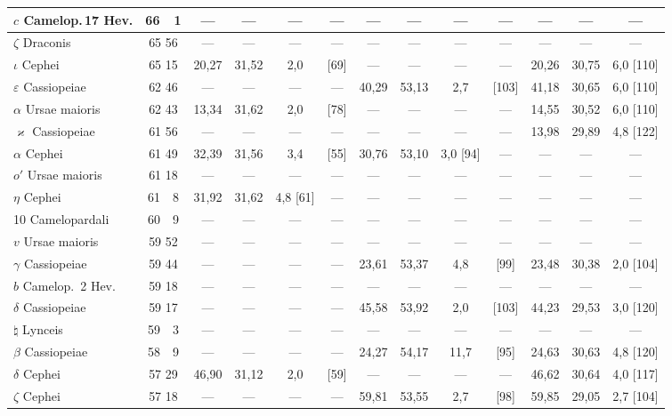 \documentclass[12pt,a4paper]{article}
\theoremstyle{plain}
\theoremstyle{definition}
\theoremstyle{remark}
\begin{document}
{\begin{center}
\begin{tabular}{l|c c c c | c c c c | c c c c}
$c$ Camelop.\,17 Hev. & 66\ \ 1 & --- & --- & --- & --- & --- & --- & --- & --- & --- & --- & --- \\
\midrule
$\zeta$ Draconis & 65 56 & --- & --- & --- & --- & --- & --- & --- & --- & --- & --- & --- \\
$\iota$ Cephei & 65 15 & 20,27 & 31,52 & 2,0 & [69] & --- & --- & --- & --- & 20,26 & 30,75 & 6,0 [110] \\
$\varepsilon$ Cassiopeiae & 62 46 & --- & --- & --- & --- & 40,29 & 53,13 & 2,7 & [103] & 41,18 & 30,65 & 6,0 [110] \\
$\alpha$ Ursae maioris & 62 43 & 13,34 & 31,62 & 2,0 & [78] & --- & --- & --- & --- & 14,55 & 30,52 & 6,0 [110] \\
$\varkappa$ Cassiopeiae & 61 56 & --- & --- & --- & --- & --- & --- & --- & --- & 13,98 & 29,89 & 4,8 [122] \\
\midrule
$\alpha$ Cephei & 61 49 & 32,39 & 31,56 & 3,4 & [55] & 30,76 & 53,10 & 3,0 [94] & --- & --- & --- & --- \\
$o'$ Ursae maioris & 61 18 & --- & --- & --- & --- & --- & --- & --- & --- & --- & --- & --- \\
$\eta$ Cephei & 61\ \ 8 & 31,92 & 31,62 & 4,8 [61] & --- & --- & --- & --- & --- & --- & --- & --- \\
10 Camelopardali & 60\ \ 9 & --- & --- & --- & --- & --- & --- & --- & --- & --- & --- & --- \\
$v$ Ursae maioris & 59 52 & --- & --- & --- & --- & --- & --- & --- & --- & --- & --- & --- \\
\midrule
$\gamma$ Cassiopeiae & 59 44 & --- & --- & --- & --- & 23,61 & 53,37 & 4,8 & [99] & 23,48 & 30,38 & 2,0 [104] \\
$b$ Camelop.\ 2 Hev. & 59 18 & --- & --- & --- & --- & --- & --- & --- & --- & --- & --- & --- \\
$\delta$ Cassiopeiae & 59 17 & --- & --- & --- & --- & 45,58 & 53,92 & 2,0 & [103] & 44,23 & 29,53 & 3,0 [120] \\
$\natural$ Lynceis & 59\ \ 3 & --- & --- & --- & --- & --- & --- & --- & --- & --- & --- & --- \\
$\beta$ Cassiopeiae & 58\ \ 9 & --- & --- & --- & --- & 24,27 & 54,17 & 11,7 & [95] & 24,63 & 30,63 & 4,8 [120] \\
\midrule
$\delta$ Cephei & 57 29 & 46,90 & 31,12 & 2,0 & [59] & --- & --- & --- & --- & 46,62 & 30,64 & 4,0 [117] \\
$\zeta$ Cephei & 57 18 & --- & --- & --- & --- & 59,81 & 53,55 & 2,7 & [98] & 59,85 & 29,05 & 2,7 [104] \\

\end{tabular}
\end{center}}
\end{document}
